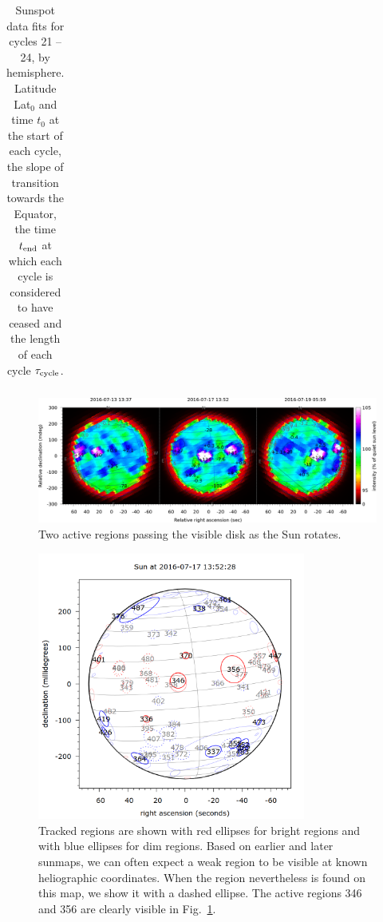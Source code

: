 \documentclass{aa}
\begin{document}
\begin{table}
\caption{\label{tab:cycles_sunspot}
Sunspot data fits for cycles 21 -- 24, by hemisphere.
Latitude Lat$_0$ and time $t_0$ at the start of each cycle, the slope of transition
towards the Equator, the time $t_{\rm end}$ at which each cycle is considered to have
ceased and the length of each cycle $\tau_{\rm cycle}$.
}
\begin{tabular}{l|ccccr}
\hline\hline

\hline
\end{tabular}
\end{table}

\begin{figure}
\centering
\includegraphics[width=\textwidth]{maptrack1.png}
\caption{Two active regions passing the visible disk as the Sun rotates.}
\label{maptrack1}
\end{figure}

\begin{figure} \centering \includegraphics[width=8.8cm]{maptrack2.png} \caption{Tracked regions are shown with red 
ellipses for bright regions and with blue ellipses for dim regions. Based on earlier and later sunmaps, we can often 
expect a weak region to be visible at known heliographic coordinates. When the region nevertheless is found on this map, 
we show it with a dashed ellipse. The active regions 346 and 356 are clearly visible in Fig.~\ref{maptrack1}.} 
\label{maptrack2} \end{figure}
\end{document}
